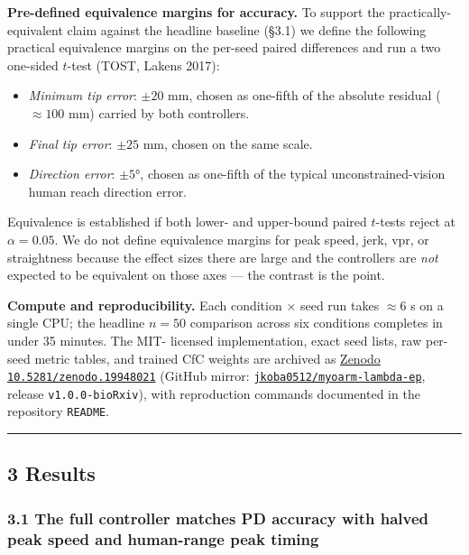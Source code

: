 \documentclass[
  11pt,
]{article}
\providecommand{\tightlist}{%
  \setlength{\itemsep}{0pt}\setlength{\parskip}{0pt}}
\begin{document}
\textbf{Pre-defined equivalence margins for accuracy.} To support the
practically-equivalent claim against the headline baseline (§3.1) we
define the following practical equivalence margins on the per-seed
paired differences and run a two one-sided \(t\)-test (TOST, Lakens
2017):

\begin{itemize}
\tightlist
\item
  \emph{Minimum tip error}: \(\pm 20\) mm, chosen as one-fifth of the
  absolute residual (\(\approx 100\) mm) carried by both controllers.
\item
  \emph{Final tip error}: \(\pm 25\) mm, chosen on the same scale.
\item
  \emph{Direction error}: \(\pm 5°\), chosen as one-fifth of the typical
  unconstrained-vision human reach direction error.
\end{itemize}

Equivalence is established if both lower- and upper-bound paired
\(t\)-tests reject at \(\alpha = 0.05\). We do not define equivalence
margins for peak speed, jerk, vpr, or straightness because the effect
sizes there are large and the controllers are \emph{not} expected to be
equivalent on those axes --- the contrast is the point.

\textbf{Compute and reproducibility.} Each condition × seed run takes
\(\approx 6\) s on a single CPU; the headline \(n = 50\) comparison
across six conditions completes in under 35 minutes. The MIT- licensed
implementation, exact seed lists, raw per-seed metric tables, and
trained CfC weights are archived as
\href{https://doi.org/10.5281/zenodo.19948021}{Zenodo
\texttt{10.5281/zenodo.19948021}} (GitHub mirror:
\href{https://github.com/jkoba0512/myoarm-lambda-ep}{\texttt{jkoba0512/myoarm-lambda-ep}},
release \texttt{v1.0.0-bioRxiv}), with reproduction commands documented
in the repository \texttt{README}.

\begin{center}\rule{0.5\linewidth}{0.5pt}\end{center}

\hypertarget{results}{%
\subsection{3 Results}\label{results}}

\hypertarget{the-full-controller-matches-pd-accuracy-with-halved-peak-speed-and-human-range-peak-timing}{%
\subsubsection{3.1 The full controller matches PD accuracy with halved
peak speed and human-range peak
timing}\label{the-full-controller-matches-pd-accuracy-with-halved-peak-speed-and-human-range-peak-timing}}
\end{document}
